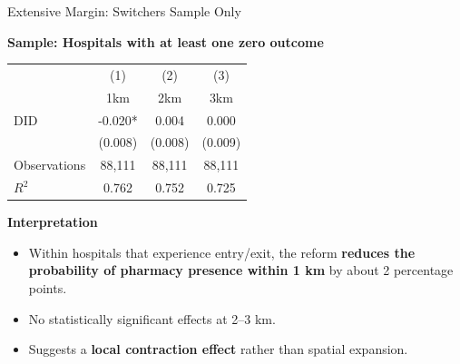\documentclass{beamer}
\begin{document}
\begin{frame}{Extensive Margin: Switchers Sample Only}

\textbf{Sample: Hospitals with at least one zero outcome}

\begin{table}[htbp]
\centering
\small
\begin{tabular}{lccc}
\toprule
 & (1) & (2) & (3) \\
 & 1km & 2km & 3km \\
\midrule
DID & -0.020* & 0.004 & 0.000 \\
    & (0.008) & (0.008) & (0.009) \\
\midrule
Observations & 88,111 & 88,111 & 88,111 \\
$R^2$ & 0.762 & 0.752 & 0.725 \\
\bottomrule
\end{tabular}
\end{table}

\vspace{0.3cm}

\textbf{Interpretation}
\begin{itemize}
    \item Within hospitals that experience entry/exit, the reform \textbf{reduces the probability of pharmacy presence within 1 km} by about 2 percentage points.
    \item No statistically significant effects at 2–3 km.
    \item Suggests a \textbf{local contraction effect} rather than spatial expansion.
\end{itemize}

\end{frame}
\end{document}
